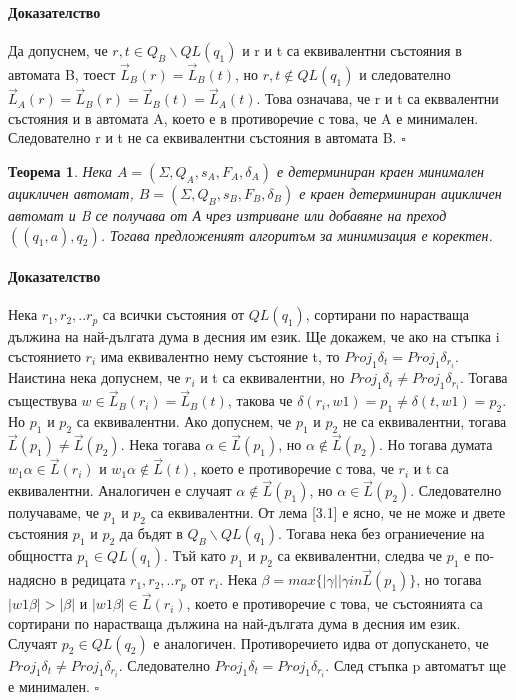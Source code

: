 \documentclass[a4paper,12pt]{article}
\newtheorem{thm}{Теорема}[section]
\newenvironment{mproof}{\paragraph{Доказателство}}{\hfill$\square$}
\begin{document}
\begin{mproof}
Да допуснем, че $r, t \in Q_B \backslash QL(q_1)$ и r и t са еквивалентни състояния в автомата B, тоест $\vec{L}_B(r) = \vec{L}_B(t)$,
но $r, t \notin QL(q_1)$ и следователно $\vec{L}_A(r) = \vec{L}_B(r) = \vec{L}_B(t) = \vec{L}_A(t)$. Това означава, че r и t са екввалентни състояния и в
автомата A, което е в противоречие с това, че A е минимален. Следователно r и t не са еквивалентни състояния в автомата B.
\end{mproof}

\begin{thm}
Нека $A = (\Sigma, Q_A, s_A, F_A, \delta_A)$ е детерминиран краен минимален ацикличен автомат, $B = (\Sigma, Q_B, s_B, F_B, \delta_B)$ е краен детерминиран
ацикличен автомат и B се получава от А чрез изтриване или добавяне на преход $((q_1, a), q_2)$. Тогава предложеният алгоритъм за минимизация е коректен.
\end{thm}

\begin{mproof}
Нека $r_1, r_2, .. r_p$ са всички състояния от $QL(q_1)$, сортирани по нарастваща дължина на най-дългата дума в десния им език. Ще докажем, че ако на стъпка i
състоянието $r_i$ има еквивалентно нему състояние t, то $Proj_1{\delta_t} = Proj_1{\delta_{r_i}}$. Наистина нека допуснем, че $r_i$ и t са еквивалентни, но
$Proj_1{\delta_t} \neq Proj_1{\delta_{r_i}}$. Тогава съществува $w \in \vec{L}_B(r_i) = \vec{L}_B(t)$, такова че
$\delta(r_i, w1) = p_1 \neq \delta(t, w1) = p_2$. Но $p_1$ и $p_2$ са еквивалентни. Ако допуснем, че $p_1$ и $p_2$ не са еквивалентни, тогава
$\vec{L}(p_1) \neq \vec{L}(p_2)$. Нека тогава $\alpha \in \vec{L}(p_1)$, но $\alpha \notin \vec{L}(p_2)$. Но тогава думата $w_1\alpha \in \vec{L}(r_i)$ и
$w_1\alpha \notin \vec{L}(t)$, което е противоречие с това, че $r_i$ и t са еквивалентни. Аналогичен е случаят
$\alpha \notin \vec{L}(p_1)$, но $\alpha \in \vec{L}(p_2)$. Следователно получаваме, че $p_1$ и $p_2$ са еквивалентни. От лема [3.1] е ясно, че не може и двете
състояния $p_1$ и $p_2$ да бъдят в $Q_B \backslash QL(q_1)$. Тогава нека без ограниечение на общността $p_1 \in QL(q_1)$. Тъй като $p_1$ и $p_2$ са еквивалентни,
следва че $p_1$ е по-надясно в редицата $r_1, r_2, .. r_p$ от $r_i$. Нека $\beta = max \{|\gamma| | \gamma in \vec{L}(p_1)\} $, но тогава
$|w1\beta| > |\beta|$ и $|w1\beta| \in \vec{L}(r_i)$, което е противоречие с това, че състоянията са сортирани по нарастваща дължина на най-дългата дума в 
десния им език. Случаят $p_2 \in QL(q_2)$ е аналогичен. Противоречието идва от допускането, че $Proj_1{\delta_t} \neq Proj_1{\delta_{r_i}}$. Следователно
$Proj_1{\delta_t} = Proj_1{\delta_{r_i}}$. След стъпка p автоматът ще е минимален.
\end{mproof}
\end{document}
